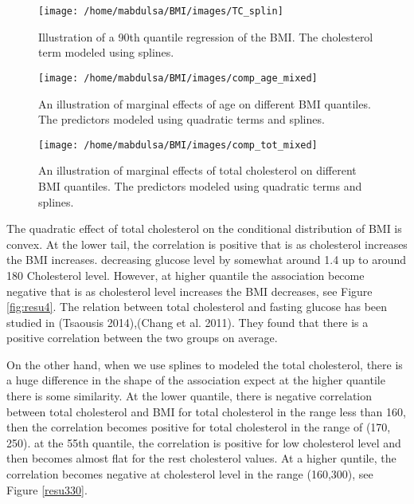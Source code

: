 \documentclass[
  12pt,
]{article}
\begin{document}
\begin{figure}

{\centering \texttt{[image: /home/mabdulsa/BMI/images/TC\_splin]} 

}

\caption{ Illustration of a 90th quantile regression of the BMI. The cholesterol term modeled  using splines. }\label{fig:resu330}
\end{figure}

\begin{figure}

{\centering \texttt{[image: /home/mabdulsa/BMI/images/comp\_age\_mixed]} 

}

\caption{  An illustration of  marginal effects of age on different BMI quantiles. The predictors modeled using quadratic terms and splines.}\label{fig:resu1000}
\end{figure}

\begin{figure}

{\centering \texttt{[image: /home/mabdulsa/BMI/images/comp\_tot\_mixed]} 

}

\caption{ An illustration of  marginal effects of total cholesterol  on different BMI quantiles. The predictors modeled using quadratic terms and splines.}\label{fig:resu1010}
\end{figure}

The quadratic effect of total cholesterol on the conditional distribution of BMI is convex. At the lower tail, the correlation is positive that is as cholesterol increases the BMI increases. decreasing glucose level by somewhat around 1.4 up to around 180 Cholesterol level. However, at higher quantile the association become negative that is as cholesterol level increases the BMI decreases, see Figure \ref{fig:resu4}. The relation between total cholesterol and fasting glucose has been studied in (Tsaousis 2014),(Chang et al. 2011). They found that there is a positive correlation between the two groups on average.

On the other hand, when we use splines to modeled the total cholesterol, there is a huge difference in the shape of the association expect at the higher quantile there is some similarity. At the lower quantile, there is negative correlation between total cholesterol and BMI for total cholesterol in the range less than 160, then the correlation becomes positive for total cholesterol in the range of (170, 250). at the 55th quantile, the correlation is positive for low cholesterol level and then becomes almost flat for the rest cholesterol values. At a higher quntile, the correlation becomes negative at cholesterol level in the range (160,300), see Figure \ref{resu330}.
\end{document}
